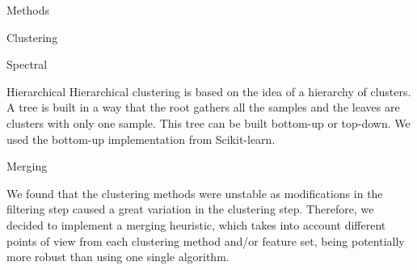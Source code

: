 \documentclass{acm_proc_article-me}
\begin{document}
\begin{section}{Methods}
\begin{subsection}{Clustering}
\begin{subsubsection}{Spectral}
\end{subsubsection}

\begin{subsubsection}{Hierarchical}
Hierarchical clustering \cite{hierarchical} is based on the idea of a hierarchy of clusters. A tree is built in a way that the root gathers all the samples and the leaves are clusters with only one sample. This tree can be built bottom-up or top-down. We used the bottom-up implementation from 
Scikit-learn.

\end{subsubsection}

\begin{subsubsection}{Merging}

We found that the clustering methods were unstable as modifications in the filtering step caused a great variation in the clustering step.
Therefore, we decided to implement a merging heuristic, which takes into account different points of view from each clustering method and/or feature set,
being potentially more robust than using one single algorithm.




\end{subsubsection}
\end{subsection}
\end{section}
\end{document}

